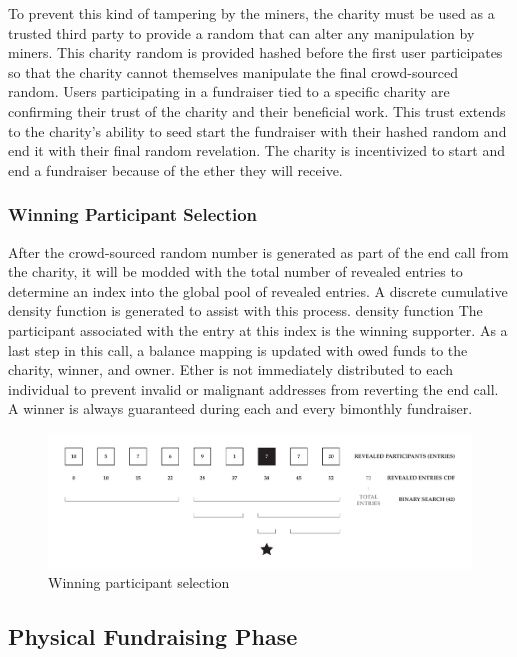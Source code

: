 \documentclass[11pt]{article}
\begin{document}
To prevent this kind of tampering by the miners, the charity must be used as a trusted third party to provide a random that can alter any manipulation by miners. This charity random is provided hashed before the first user participates so that the charity cannot themselves manipulate the final crowd-sourced random. Users participating in a fundraiser tied to a specific charity are confirming their trust of the charity and their beneficial work. This trust extends to the charity's ability to seed start the fundraiser with their hashed random and end it with their final random revelation. The charity is incentivized to start and end a fundraiser because of the ether they will receive.

\subsubsection{Winning Participant Selection}

After the crowd-sourced random number is generated as part of the end call from the charity, it will be modded with the total number of revealed entries to determine an index into the global pool of revealed entries. A discrete cumulative density function is generated to assist with this process. density function The participant associated with the entry at this index is the winning supporter. As a last step in this call, a balance mapping is updated with owed funds to the charity, winner, and owner. Ether is not immediately distributed to each individual to prevent invalid or malignant addresses from reverting the end call. A winner is always guaranteed during each and every bimonthly fundraiser.

\begin{figure}[H]
\begin{center}
\includegraphics[width=1.0\textwidth]{winningParticipantSelection.pdf}
\caption{Winning participant selection}
\label{figure:winningParticipantSelection}
\end{center}
\end{figure}

\subsection{Physical Fundraising Phase}
\end{document}
